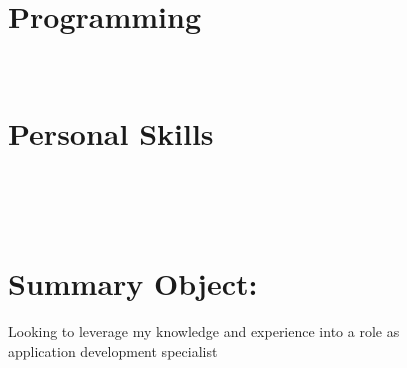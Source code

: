\documentclass[]{friggeri-cv}
\begin{document}
\begin{aside}
  \section{Programming}
~
~
~
  \section{Personal Skills}
~
    ~
\end{aside}
~



\section{Summary Object:}
\begin{entrylist}
 { Looking to leverage my knowledge and experience into a role  as\\ application development specialist}
\end{entrylist}
\end{document}
